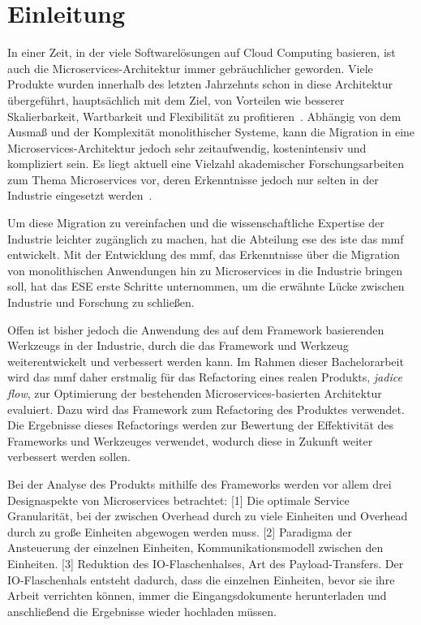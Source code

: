 \chapter{Einleitung}
\label{chap:einleitung}

In einer Zeit, in der viele Softwarelösungen auf Cloud Computing basieren, ist auch die Microservices-Architektur immer gebräuchlicher geworden.
Viele Produkte wurden innerhalb des letzten Jahrzehnts schon in diese Architektur übergeführt, hauptsächlich mit dem Ziel, von Vorteilen wie besserer Skalierbarkeit, Wartbarkeit und Flexibilität zu profitieren~\cite{Fritzsch_2019,taibi2017processmotivations}.
Abhängig von dem Ausmaß und der Komplexität monolithischer Systeme, kann die Migration in eine Microservices-Architektur jedoch sehr zeitaufwendig, kostenintensiv und kompliziert sein.
Es liegt aktuell eine Vielzahl akademischer Forschungsarbeiten zum Thema Microservices vor, deren Erkenntnisse jedoch nur selten in der Industrie eingesetzt werden~\cite{fritzsch2022architecturecentric}.

Um diese Migration zu vereinfachen und die wissenschaftliche Expertise der Industrie leichter zugänglich zu machen, hat die Abteilung \gls{ese} des \gls{iste} das \gls{mmf} entwickelt.
Mit der Entwicklung des \gls{mmf}, das Erkenntnisse über die Migration von monolithischen Anwendungen hin zu Microservices in die Industrie bringen soll, hat das ESE erste Schritte unternommen, um die erwähnte Lücke zwischen Industrie und Forschung zu schließen.

Offen ist bisher jedoch die Anwendung des auf dem Framework basierenden Werkzeugs in der Industrie, durch die das Framework und Werkzeug weiterentwickelt und verbessert werden kann.
Im Rahmen dieser Bachelorarbeit wird das \acrshort{mmf} daher erstmalig für das Refactoring eines realen Produkts, \emph{jadice flow}, zur Optimierung der bestehenden Microservices-basierten Architektur evaluiert.
Dazu wird das Framework zum Refactoring des Produktes verwendet.
Die Ergebnisse dieses Refactorings werden zur Bewertung der Effektivität des Frameworks und Werkzeuges verwendet, wodurch diese in Zukunft weiter verbessert werden sollen.

Bei der Analyse des Produkts mithilfe des Frameworks werden vor allem drei Designaspekte von Microservices betrachtet:
[1] Die optimale Service Granularität, bei der zwischen Overhead durch zu viele Einheiten und Overhead durch zu große Einheiten abgewogen werden muss.
[2] Paradigma der Ansteuerung der einzelnen Einheiten, Kommunikationsmodell zwischen den Einheiten.
[3] Reduktion des IO-Flaschenhalses, Art des Payload-Transfers.
Der IO-Flaschenhals entsteht dadurch, dass die einzelnen Einheiten, bevor sie ihre Arbeit verrichten können, immer die Eingangsdokumente herunterladen und anschließend die Ergebnisse wieder hochladen müssen.


